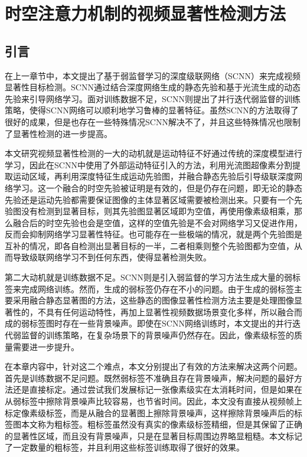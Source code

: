 \chapter{时空注意力机制的视频显著性检测方法}
\renewcommand{\leftmark}{第三章\quad 时空注意力机制的视频显著性检测方法}

\section{引言}
在上一章节中，本文提出了基于弱监督学习的深度级联网络（SCNN）来完成视频显著性目标检测。SCNN通过结合深度网络生成的静态先验和基于光流生成的动态先验来引导网络学习。面对训练数据不足，SCNN则提出了并行迭代弱监督的训练策略，使得SCNN网络可以顺利地学习鲁棒的显著特征。虽然SCNN的方法取得了很好的成果，但是也存在一些特殊情况SCNN解决不了，并且这些特殊情况也限制了显著性检测的进一步提高。

本文研究视频显著性检测的一大的动机就是运动特征不好通过传统的深度模型进行学习，因此在SCNN中使用了外部运动特征引入的方法，利用光流图超像素分割提取运动区域，再利用深度特征生成运动先验图，并融合静态先验后引导级联深度网络学习。这一个融合的时空先验被证明是有效的，但是仍存在问题，即无论的静态先验还是运动先验都需要保证图像的主体显著区域需要被检测出来。只要有一个先验图没有检测到显著目标，则其先验图显著区域即为空值，再使用像素级相乘，那么融合后的时空先验也会是空值，这样的空值先验是不会对网络学习又促进作用，反而会抑制网络学习显著性特征。也可能存在一些极端的情况，就是两个先验图是互补的情况，即各自检测出显著目标的一半，二者相乘则整个先验图都为空值，从而导致级联网络学习不到任何东西，使得显著检测失败。

第二大动机就是训练数据不足。SCNN则是引入弱监督的学习方法生成大量的弱标签来完成网络训练。然而，生成的弱标签仍存在不小的问题。由于生成的弱标签主要采用融合静态显著图的方法，这些静态的图像显著性检测方法主要是处理图像显著性的，不具有任何运动特性，再加上显著性视频数据场景变化多样，所以融合而成的弱标签图时存在一些背景噪声。即使在SCNN网络训练时，本文提出的并行迭代弱监督的训练策略，在复杂场景下的背景噪声仍然存在。因此，像素级标签的质量需要进一步提升。

在本章内容中，针对这二个难点，本文分别提出了有效的方法来解决这两个问题。首先是训练数据不足问题。既然弱标签不准确且存在背景噪声，解决问题的最好方法还是直接标定。通过尝试我们发展标记一张像素级实在太消耗时间，但是如果在从弱标签中擦除背景噪声比较容易，也节省时间。因此，本文没有直接从视频帧上标定像素级标签，而是从融合的显著图上擦除背景噪声，这样擦除背景噪声后的标签图本文称为粗标签。粗标签虽然没有真实的像素级标签精细，但是其保留了正确的显著性区域，而且没有背景噪声，只是在显著目标周围边界略显粗糙。本文标记了一定数量的粗标签，并且利用这些标签训练取得了很好的效果。

